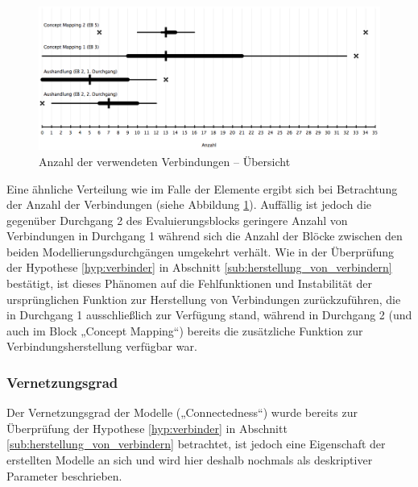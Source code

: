 \begin{figure}[htbp]
	\centering
		\includegraphics[width=15cm]{img/Evaluierung/elementUsageConnectorsOverview.png}
	\caption{Anzahl der verwendeten Verbindungen -- Übersicht}
	\label{fig:img_Evaluierung_elementUsageConnectorsOverview}
\end{figure}

Eine ähnliche Verteilung wie im Falle der Elemente ergibt sich bei Betrachtung der Anzahl der Verbindungen (siehe Abbildung \ref{fig:img_Evaluierung_elementUsageConnectorsOverview}). Auffällig ist jedoch die gegenüber Durchgang 2 des Evaluierungsblocks geringere Anzahl von Verbindungen in Durchgang 1 während sich die Anzahl der Blöcke zwischen den beiden Modellierungsdurchgängen umgekehrt verhält. Wie in der Überprüfung der Hypothese \ref{hyp:verbinder} in Abschnitt \ref{sub:herstellung_von_verbindern} bestätigt, ist dieses Phänomen auf die Fehlfunktionen und Instabilität der ursprünglichen Funktion zur Herstellung von Verbindungen zurückzuführen, die in Durchgang 1 ausschließlich zur Verfügung stand, während in Durchgang 2 (und auch im Block „Concept Mapping“) bereits die zusätzliche Funktion zur Verbindungsherstellung verfügbar war.


\subsubsection{Vernetzungsgrad} %
\label{ssub:vernetzungsgrad}

Der Vernetzungsgrad der Modelle („Connectedness“) wurde bereits zur Überprüfung der Hypothese \ref{hyp:verbinder} in Abschnitt \ref{sub:herstellung_von_verbindern} betrachtet, ist jedoch eine Eigenschaft der erstellten Modelle an sich und wird hier deshalb nochmals als deskriptiver Parameter beschrieben.

